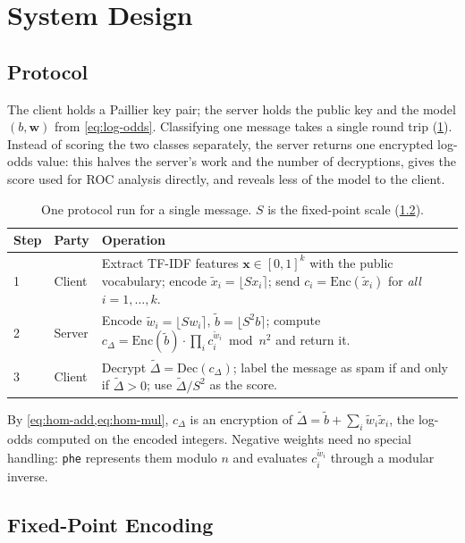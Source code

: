 \section{System Design}\label{sec:system-design}

\subsection{Protocol}

The client holds a Paillier key pair; the server holds the public key and the model $(b, \mathbf{w})$ from \cref{eq:log-odds}.
Classifying one message takes a single round trip (\cref{tab:protocol}).
Instead of scoring the two classes separately, the server returns one encrypted log-odds value: this halves the server's work and the number of decryptions, gives the score used for ROC analysis directly, and reveals less of the model to the client.

\begin{table}[htbp]
  \centering
  \caption{One protocol run for a single message. $S$ is the fixed-point scale (\cref{sec:fixed-point}).}
  \label{tab:protocol}
  \begin{tabular}{@{}l l p{}@{}}
    \toprule
    Step & Party & Operation \\
    \midrule
    1 & Client & Extract TF-IDF features $\mathbf{x} \in [0, 1]^k$ with the public vocabulary; encode $\tilde{x}_i = \lfloor S x_i \rceil$; send $c_i = \mathrm{Enc}(\tilde{x}_i)$ for \emph{all} $i = 1, \dots, k$. \\
    2 & Server & Encode $\tilde{w}_i = \lfloor S w_i \rceil$, $\tilde{b} = \lfloor S^2 b \rceil$; compute $c_\Delta = \mathrm{Enc}(\tilde{b}) \cdot \prod_{i} c_i^{\tilde{w}_i} \bmod n^2$ and return it. \\
    3 & Client & Decrypt $\tilde{\Delta} = \mathrm{Dec}(c_\Delta)$; label the message as spam if and only if $\tilde{\Delta} > 0$; use $\tilde{\Delta} / S^2$ as the score. \\
    \bottomrule
  \end{tabular}
\end{table}

By \cref{eq:hom-add,eq:hom-mul}, $c_\Delta$ is an encryption of $\tilde{\Delta} = \tilde{b} + \sum_i \tilde{w}_i \tilde{x}_i$, the log-odds computed on the encoded integers.
Negative weights need no special handling: \texttt{phe} represents them modulo $n$ and evaluates $c_i^{\tilde{w}_i}$ through a modular inverse.

\subsection{Fixed-Point Encoding}\label{sec:fixed-point}

